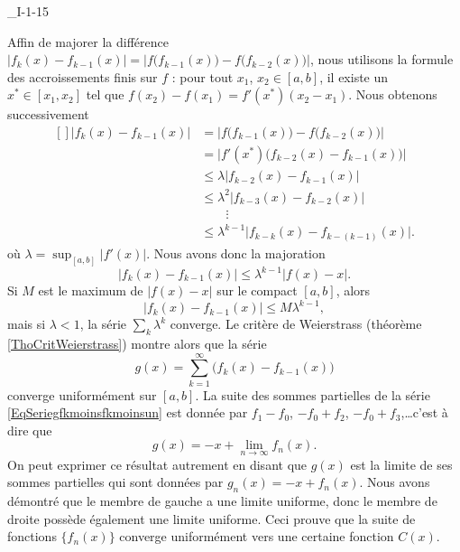

\begin{corrige}{_I-1-15}

Affin de majorer la différence $| f_k(x)-f_{k-1}(x) |=| f\big( f_{k-1}(x) \big)-f\big( f_{k-2}(x) \big) |$, nous utilisons la formule des accroissements finis sur $f$ : pour tout $x_1$, $x_2\in[a,b]$, il existe un $x^*\in[x_1,x_2]$ tel que $f(x_2)-f(x_1)=f'(x^*)(x_2-x_1)$. Nous obtenons successivement 
\begin{equation}
	\begin{aligned}[]
		| f_k(x)-f_{k-1}(x) |	&=	\Big| f\big( f_{k-1}(x) \big)-f\big( f_{k-2}(x) \big) \Big|\\
					&=	\Big| f'(x^*)\big( f_{k-2}(x)-f_{k-1}(x) \big)  \Big|\\
					&\leq	\lambda\big| f_{k-2}(x)-f_{k-1}(x) \big|\\
					&\leq	\lambda^2\big| f_{k-3}(x)-f_{k-2}(x) \big|\\
					&\qquad\vdots	\\
					&\leq	\lambda^{k-1}\big| f_{k-k}(x)-f_{k-(k-1)}(x) \big|.
	\end{aligned}
\end{equation}
où $\lambda=\sup_{[a,b]}| f'(x) |$. Nous avons donc la majoration
\begin{equation}
	| f_k(x)-f_{k-1}(x)|\leq \lambda^{k-1}| f(x)-x |.
\end{equation}
Si $M$ est le maximum de $| f(x)-x |$ sur le compact $[a,b]$, alors
\begin{equation}
	| f_k(x)-f_{k-1}(x)|\leq M\lambda^{k-1},
\end{equation}
mais si $\lambda<1$, la série $\sum_k\lambda^k$ converge. Le critère de Weierstrass (théorème \ref{ThoCritWeierstrass}) montre alors que la série
\begin{equation}		\label{EqSeriegfkmoinsfkmoinsun}
	g(x)=\sum_{k=1}^{\infty}\big( f_k(x)-f_{k-1}(x) \big)
\end{equation}
converge uniformément sur $[a,b]$. La suite des sommes partielles de la série \eqref{EqSeriegfkmoinsfkmoinsun} est donnée par $f_1-f_0$, $-f_0+f_2$, $-f_0+f_3$,\ldots c'est à dire que
\begin{equation}
	g(x)=-x+\lim_{n\to\infty}f_n(x).
\end{equation}
On peut exprimer ce résultat autrement en disant que $g(x)$ est la limite de ses sommes partielles qui sont données par $g_n(x)=-x+f_n(x)$. Nous avons démontré que le membre de gauche a une limite uniforme, donc le membre de droite possède également une limite uniforme. Ceci prouve que la suite de fonctions $\{ f_n(x) \}$ converge uniformément vers une certaine fonction $C(x)$.


\end{corrige}
